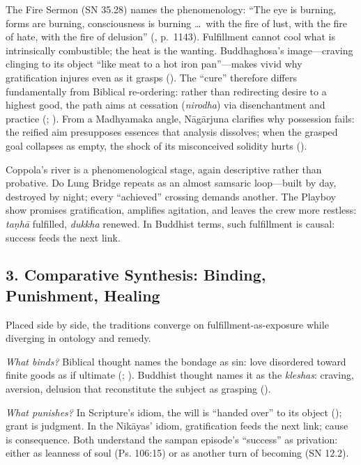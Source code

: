 \documentclass[12pt]{article}
\begin{document}
The Fire Sermon (SN 35.28) names the phenomenology: ``The eye is burning, forms are burning, consciousness is burning \ldots\ with the fire of lust, with the fire of hate, with the fire of delusion'' (\parencite{BodhiSN2000}, p.~1143). Fulfillment cannot cool what is intrinsically combustible; the heat is the wanting. Buddhaghosa’s image---craving clinging to its object ``like meat to a hot iron pan''---makes vivid why gratification injures even as it grasps (\parencite{BuddhaghosaVisuddhi1956}). The ``cure'' therefore differs fundamentally from Biblical re-ordering: rather than redirecting desire to a highest good, the path aims at cessation (\emph{nirodha}) via disenchantment and practice (\parencite{Rahula1959}; \parencite{Gethin1998}). From a Madhyamaka angle, Nāgārjuna clarifies why possession fails: the reified aim presupposes essences that analysis dissolves; when the grasped goal collapses as empty, the shock of its misconceived solidity hurts (\parencite{NagarjunaMMK2013}).

Coppola’s river is a phenomenological stage, again descriptive rather than probative. Do Lung Bridge repeats as an almost samsaric loop---built by day, destroyed by night; every ``achieved'' crossing demands another. The Playboy show promises gratification, amplifies agitation, and leaves the crew more restless: \emph{taṇhā} fulfilled, \emph{dukkha} renewed. In Buddhist terms, such fulfillment is causal: success feeds the next link.

\subsection*{3. Comparative Synthesis: Binding, Punishment, Healing}

Placed side by side, the traditions converge on fulfillment-as-exposure while diverging in ontology and remedy.

\emph{What binds?} Biblical thought names the bondage as sin: love disordered toward finite goods as if ultimate (\parencite{AugustineConfessions1998}; \parencite{AquinasST1947}). Buddhist thought names it as the \emph{kleshas}: craving, aversion, delusion that reconstitute the subject as grasping (\parencite{BodhiSN2000}).

\emph{What punishes?} In Scripture’s idiom, the will is ``handed over'' to its object (\parencite{FitzmyerRomans1993}); grant is judgment. In the Nikāyas’ idiom, gratification feeds the next link; cause is consequence. Both understand the sampan episode’s ``success'' as privation: either as leanness of soul (Ps. 106:15) or as another turn of becoming (SN 12.2).
\end{document}
